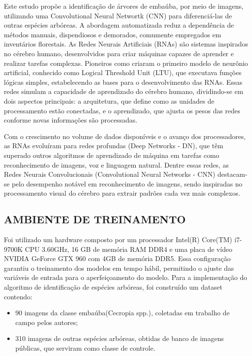 Este estudo propõe a identificação de árvores de embaúba, por meio de imagens, utilizando uma Convolutional Neural Networtk (CNN) para diferenciá-las de outras espécies arbóreas. A abordagem automatizada reduz a dependência de métodos manuais, dispendiosos e demorados, comumente empregados em inventários florestais. As Redes Neurais Artificiais (RNAs) são sistemas inspirados no cérebro humano, desenvolvidos para criar máquinas capazes de aprender e realizar tarefas complexas. Pioneiros como \cite{mcculloch1943logical} criaram o primeiro modelo de neurônio artificial, conhecido como Logical Threshold Unit (LTU), que executava funções lógicas simples, estabelecendo as bases para o desenvolvimento das RNAs. Essas redes simulam a capacidade de aprendizado do cérebro humano, dividindo-se em dois aspectos principais: a arquitetura, que define como as unidades de processamento estão conectadas, e o aprendizado, que ajusta os pesos das redes conforme novas informações são processadas.

Com o crescimento no volume de dados disponíveis e o avanço dos processadores, as RNAs evoluíram para redes profundas (Deep Networks - DN), que têm superado outros algoritmos de aprendizado de máquina em tarefas como reconhecimento de imagens, voz e linguagem natural. Dentre essas redes, as Redes Neurais Convolucionais (Convolutional Neural Networks - CNN) destacam-se pelo desempenho notável em reconhecimento de imagens, sendo inspiradas no processamento visual do cérebro para extrair padrões cada vez mais complexos. 

\subsection*{AMBIENTE DE TREINAMENTO}
Foi utilizado um hardware composto por um processador Intel(R) Core(TM) i7-9700K CPU 3.60GHz, 16 GB de memória RAM DDR4 e uma placa de vídeo NVIDIA GeForce GTX 960 com 4GB de memória DDR5. Essa configuração garantiu o treinamento dos modelos em tempo hábil, permitindo o ajuste das variáveis de entrada para o aperfeiçoamento do modelo.
Para a implementação do algoritmo de identificação de espécies arbóreas, foi construído um dataset contendo:
\begin{itemize}
    \item 90 imagens da classe embaúba(Cecropia spp.), coletadas em trabalho de campo pelos autores;
    \item 310 imagens de outras espécies arbóreas, obtidas de banco de imagens públicas, que serviram como classe de controle.
\end{itemize}

